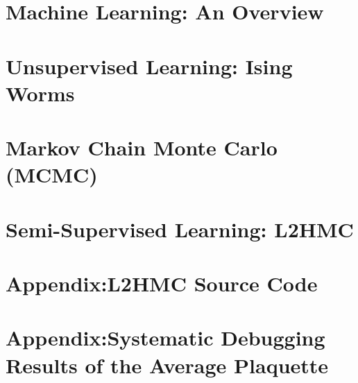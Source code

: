 \documentclass[11pt,notitlepage]{report}
\begin{document}
\chapter{Machine Learning: An Overview}%
\label{chap:machine_learning}


\chapter{Unsupervised Learning: Ising Worms}%
\label{chap:unsupervised_learning}

%
\chapter{Markov Chain Monte Carlo (MCMC)}%
\label{chap:mcmc}


\chapter{Semi-Supervised Learning: L2HMC}%
\label{chap:semi_supervised_learning}


% 
% 
% 

% 
% 
% 

% 

\begin{appendix}
%
\chapter{Appendix:\@ L2HMC Source Code}%
\label{chap:l2hmc_source_code}

% 
\chapter{Appendix:\@ Systematic Debugging Results of the Average Plaquette}%
\label{chap:debugging_results}
% 

%
\end{appendix}

\clearpage
\printbibliography[title={References}, heading=bibintoc]
\end{document}
